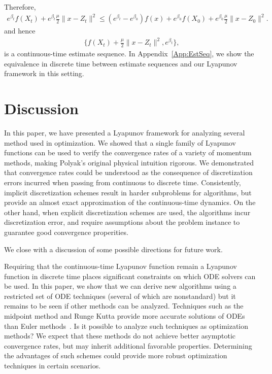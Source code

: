 \documentclass[11pt]{article}
\theoremstyle{plain}
\begin{document}
Therefore, 
\begin{align*}
e^{\beta_t} f(X_t) + e^{\beta_t}\frac{\mu}{2} \|x - Z_t\|^2 \leq (e^{\beta_t} - e^{\beta_0}) f(x) + e^{\beta_0}  f(X_0) + e^{\beta_0} \frac{\mu}{2} \|x - Z_0\|^2.
\end{align*}
and hence \begin{align*}
\{f(X_t) + \frac{\mu}{2} \|x - Z_t\|^2, e^{\beta_t}\},
\end{align*}
is a continuous-time estimate sequence. In Appendix~\ref{App:EstSeq}, we show the equivalence in discrete time between estimate sequences and our Lyapunov framework in this setting.

\section{Discussion}
In this paper, we have presented a Lyapunov framework for analyzing several method used in optimization. We showed that a single family of Lyapunov functions can be used to verify the convergence rates of a variety of momentum methods, making Polyak's original physical intuition rigorous.  We demonstrated that convergence rates could be understood as the consequence of discretization errors incurred when passing from continuous to discrete time.  Consistently, implicit discretization schemes result in harder subproblems for algorithms, but provide an almost exact approximation of the continuous-time dynamics.   On the other hand, when explicit discretization schemes are used, the algorithms incur discretization error, and require assumptions about the problem instance to guarantee good convergence properities.

We close with a discussion of some possible directions for future work.

Requiring that the continuous-time Lyapunov function remain a Lyapunov function in discrete time places significant constraints on which ODE solvers can be used.  In this paper, we show that we can derive new algorithms using a restricted set of ODE techniques (several of which are nonstandard) but it remains to be seen if other methods can be analyzed.  Techniques such as the midpoint method and Runge Kutta provide more accurate solutions of ODEs than Euler methods~\cite{Butcher20001}.  Is it possible to analyze such techniques as optimization methods?  We expect that these methods do not achieve better asymptotic convergence rates, but may inherit additional favorable properties.  Determining the advantages of such schemes could provide more robust optimization techniques in certain scenarios.
\end{document}
